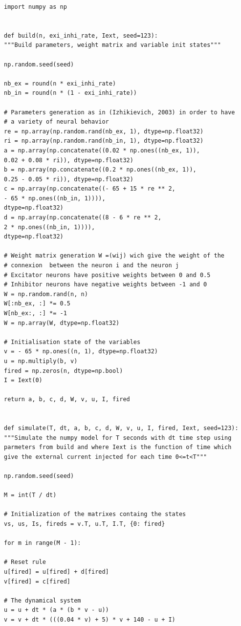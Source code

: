 \documentclass[12pt]{scrartcl}
\begin{document}
\clearpage
\begin{lstlisting}[caption = {Numpy vs Tensorflow : Implémentation Numpy}]
import numpy as np


def build(n, exi_inhi_rate, Iext, seed=123):
"""Build parameters, weight matrix and variable init states"""

np.random.seed(seed)

nb_ex = round(n * exi_inhi_rate)
nb_in = round(n * (1 - exi_inhi_rate))

# Parameters generation as in (Izhikievich, 2003) in order to have
# a variety of neural behavior
re = np.array(np.random.rand(nb_ex, 1), dtype=np.float32)
ri = np.array(np.random.rand(nb_in, 1), dtype=np.float32)
a = np.array(np.concatenate((0.02 * np.ones((nb_ex, 1)),
0.02 + 0.08 * ri)), dtype=np.float32)
b = np.array(np.concatenate((0.2 * np.ones((nb_ex, 1)),
0.25 - 0.05 * ri)), dtype=np.float32)
c = np.array(np.concatenate((- 65 + 15 * re ** 2,
- 65 * np.ones((nb_in, 1)))),
dtype=np.float32)
d = np.array(np.concatenate((8 - 6 * re ** 2,
2 * np.ones((nb_in, 1)))),
dtype=np.float32)

# Weight matrix generation W =(wij) wich give the weight of the
# connexion  between the neuron i and the neuron j
# Excitator neurons have positive weights between 0 and 0.5
# Inhibitor neurons have negative weights between -1 and 0
W = np.random.rand(n, n)
W[:nb_ex, :] *= 0.5
W[nb_ex:, :] *= -1
W = np.array(W, dtype=np.float32)

# Initialisation state of the variables
v = - 65 * np.ones((n, 1), dtype=np.float32)
u = np.multiply(b, v)
fired = np.zeros(n, dtype=np.bool)
I = Iext(0)

return a, b, c, d, W, v, u, I, fired


def simulate(T, dt, a, b, c, d, W, v, u, I, fired, Iext, seed=123):
"""Simulate the numpy model for T seconds with dt time step using 
parmeters from build and where Iext is the function of time which 
give the external current injected for each time 0<=t<T"""

np.random.seed(seed)

M = int(T / dt)

# Initialization of the matrixes containg the states
vs, us, Is, fireds = v.T, u.T, I.T, {0: fired}

for m in range(M - 1):

# Reset rule
u[fired] = u[fired] + d[fired]
v[fired] = c[fired]

# The dynamical system
u = u + dt * (a * (b * v - u))
v = v + dt * (((0.04 * v) + 5) * v + 140 - u + I)


\end{lstlisting}
\end{document}
